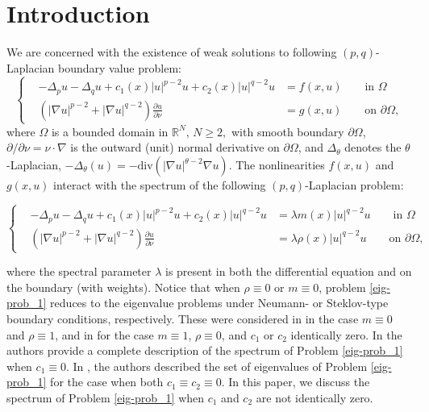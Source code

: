 \documentclass[pdflatex,sn-mathphys-num]{sn-jnl}
\theoremstyle{thmstyleone}%
\theoremstyle{thmstyletwo}%
\theoremstyle{thmstylethree}%
\theoremstyle{thmstylethree}%
\begin{document}


\maketitle

\section{Introduction}\label{sec1}

We are concerned with the existence of weak solutions to following $(p,q)$-Laplacian boundary value problem:
\begin{equation}\label{nonlinpde}
\left\{\begin{array}{lrl}
        &-\Delta_p u-\Delta_q u +c_1(x)|u|^{p-2}u+c_2(x)|u|^{q-2}u&= f(x,u) \qquad \text{in } \Omega  \\
        &(|\nabla u|^{p-2}+|\nabla u|^{q-2})\frac{\partial u}{\partial \nu}&=g(x,u)\qquad \text{on }  \partial\Omega,
\end{array}   \right. 
\end{equation}
where $\Omega$ is a bounded domain in $\mathbb{R}^N,\, N\ge 2,$ with smooth boundary $\partial \Omega$,  $\partial/\partial\nu=\nu\cdot\nabla$ is the outward (unit) normal derivative on $\partial \Omega$, and $\Delta_{\theta}$ denotes the $\theta$-Laplacian, $-\Delta_{\theta}(u)=-\text{div}(|\nabla u|^{\theta-2}\nabla
 u)$. The nonlinearities $f(x,u)$ and  $g(x,u)$ interact with the spectrum of the following $(p,q)$-Laplacian problem:

\begin{equation}\label{eig-prob_1}
\left\{\begin{array}{lrl}
&        -\Delta_p u-\Delta_q u +c_1(x)|u|^{p-2}u+c_2(x)|u|^{q-2}u&=\lambda m(x)|u|^{q-2}u \qquad \text{in } \Omega  \\
      &  (|\nabla u|^{p-2}+|\nabla u|^{q-2})\frac{\partial u}{\partial \nu}&=\lambda \rho(x)|u|^{q-2}u\qquad \text{on }  \partial\Omega ,
\end{array}   \right. 
\end{equation}

where the spectral parameter $\lambda$ is present in both the differential equation and on the boundary (with weights). Notice that when $\rho\equiv 0$ or $m\equiv 0$, problem \eqref{eig-prob_1} reduces to the eigenvalue problems under Neumann- or Steklov-type boundary conditions, respectively. These were considered in \cite{BLMG} in the case $m\equiv 0 $ and $\rho \equiv 1$, and in \cite{MM} for the case $m\equiv 1$, $\rho\equiv 0$, and $c_1$ or $c_2$ identically zero. In \cite{BLM} the authors provide a complete description of the spectrum of Problem \eqref{eig-prob_1} when $c_1\equiv 0$.  In \cite{BMG}, the authors described the set of eigenvalues of Problem \ref{eig-prob_1} for the case when both  $c_1\equiv c_2\equiv 0$. In this paper, we discuss the spectrum of Problem \eqref{eig-prob_1}  when $c_1$ and $c_2$ are not identically zero.
\end{document}
